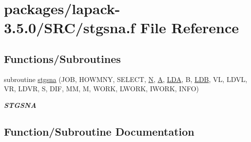 \hypertarget{stgsna_8f}{}\section{packages/lapack-\/3.5.0/\+S\+R\+C/stgsna.f File Reference}
\label{stgsna_8f}
\subsection*{Functions/\+Subroutines}
\begin{DoxyCompactItemize}
\item 
subroutine \hyperlink{stgsna_8f_a4288220546abeaa11e0fa24d99dae391}{stgsna} (J\+O\+B, H\+O\+W\+M\+N\+Y, S\+E\+L\+E\+C\+T, \hyperlink{polmisc_8c_a0240ac851181b84ac374872dc5434ee4}{N}, \hyperlink{classA}{A}, \hyperlink{example__user_8c_ae946da542ce0db94dced19b2ecefd1aa}{L\+D\+A}, B, \hyperlink{example__user_8c_a50e90a7104df172b5a89a06c47fcca04}{L\+D\+B}, V\+L, L\+D\+V\+L, V\+R, L\+D\+V\+R, S, D\+I\+F, M\+M, M, W\+O\+R\+K, L\+W\+O\+R\+K, I\+W\+O\+R\+K, I\+N\+F\+O)
\begin{DoxyCompactList}\small\item\em {\bfseries S\+T\+G\+S\+N\+A} \end{DoxyCompactList}\end{DoxyCompactItemize}


\subsection{Function/\+Subroutine Documentation}
\hypertarget{stgsna_8f_a4288220546abeaa11e0fa24d99dae391}{}
